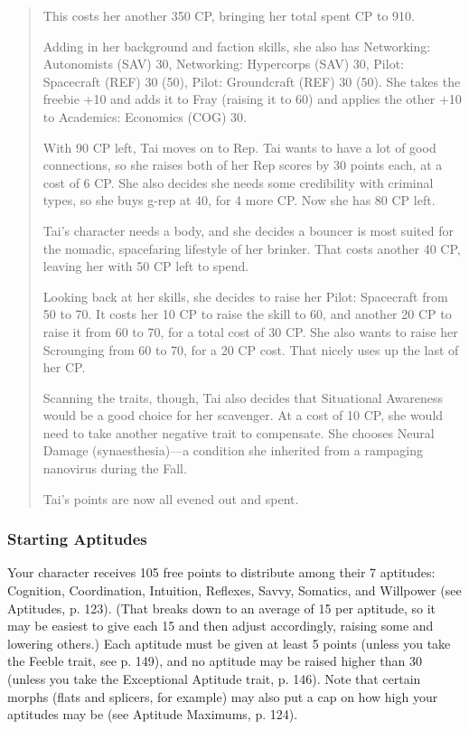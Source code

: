 \begin{quotation}
This costs her another 350 CP, bringing her total spent CP to 910.

Adding in her background and faction skills, she also has Networking: Autonomists (SAV) 30, Networking: Hypercorps (SAV) 30, Pilot: Spacecraft (REF) 30 (50), Pilot: Groundcraft (REF) 30 (50). She takes the freebie +10 and adds it to Fray (raising it to 60) and applies the other +10 to Academics: Economics (COG) 30.

With 90 CP left, Tai moves on to Rep. Tai wants to have a lot of good connections, so she raises both of her Rep scores by 30 points each, at a cost of 6 CP. She also decides she needs some credibility with criminal types, so she buys g-rep at 40, for 4 more CP. Now she has 80 CP left.

Tai’s character needs a body, and she decides a bouncer is most suited for the nomadic, spacefaring lifestyle of her brinker. That costs another 40 CP, leaving her with 50 CP left to spend.

Looking back at her skills, she decides to raise her Pilot: Spacecraft from 50 to 70. It costs her 10 CP to raise the skill to 60, and another 20 CP to raise it from 60 to 70, for a total cost of 30 CP. She also wants to raise her Scrounging from 60 to 70, for a 20 CP cost. That nicely uses up the last of her CP.

Scanning the traits, though, Tai also decides that Situational Awareness would be a good choice for her scavenger. At a cost of 10 CP, she would need to take another negative trait to compensate. She chooses Neural Damage (synaesthesia)—a condition she inherited from a rampaging nanovirus during the Fall.

Tai’s points are now all evened out and spent.
\end{quotation}

\subsubsection{Starting Aptitudes}
\label{sec:starting-aptitudes}

Your character receives 105 free points to distribute among their 7 aptitudes: Cognition, Coordination, Intuition, Reflexes, Savvy, Somatics, and Willpower (see Aptitudes, p. 123). (That breaks down to an average of 15 per aptitude, so it may be easiest to give each 15 and then adjust accordingly, raising some and lowering others.) Each aptitude must be given at least 5 points (unless you take the Feeble trait, see p. 149), and no aptitude may be raised higher than 30 (unless you take the Exceptional Aptitude trait, p. 146). Note that certain morphs (flats and splicers, for example) may also put a cap on how high your aptitudes may be (see Aptitude Maximums, p. 124).

